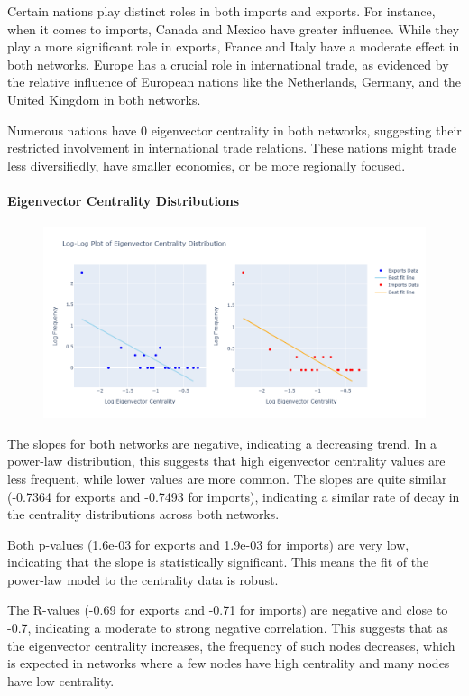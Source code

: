 \documentclass[12pt, a4paper]{article}
\begin{document}
Certain nations play distinct roles in both imports and exports. For instance, when it comes to imports, Canada and Mexico have greater influence. While they play a more significant role in exports, France and Italy have a moderate effect in both networks. Europe has a crucial role in international trade, as evidenced by the relative influence of European nations like the Netherlands, Germany, and the United Kingdom in both networks.

Numerous nations have 0 eigenvector centrality in both networks, suggesting their restricted involvement in international trade relations. These nations might trade less diversifiedly, have smaller economies, or be more regionally focused.
\paragraph{Eigenvector Centrality Distributions}
\begin{figure}[ht]
\centering
\includegraphics[scale=0.4]{img/eigendist.png}
\label{fig:eigendist}
\end{figure}
The slopes for both networks are negative, indicating a decreasing trend. In a power-law distribution, this suggests that high eigenvector centrality values are less frequent, while lower values are more common. The slopes are quite similar (-0.7364 for exports and -0.7493 for imports), indicating a similar rate of decay in the centrality distributions across both networks.

Both p-values (1.6e-03 for exports and 1.9e-03 for imports) are very low, indicating that the slope is statistically significant. This means the fit of the power-law model to the centrality data is robust.

The R-values (-0.69 for exports and -0.71 for imports) are negative and close to -0.7, indicating a moderate to strong negative correlation. This suggests that as the eigenvector centrality increases, the frequency of such nodes decreases, which is expected in networks where a few nodes have high centrality and many nodes have low centrality.
\end{document}
